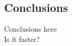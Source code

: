 \documentclass[twoside]{article}
\theoremstyle{definition}
\theoremstyle{plain}
\begin{document}
\begin{multicols}{2}
\section{Conclusions}

Conclusions here \\
Is it faster?


\printbibliography




\end{multicols}
\newpage
\end{document}
